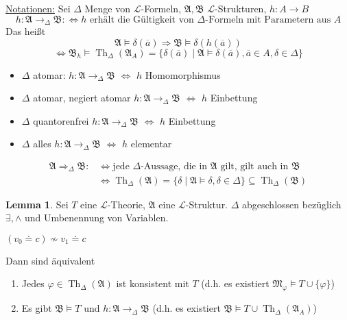 \documentclass[12pt,parskip=full]{scrartcl}
\newcommand{\heading}{\underline}
\theoremstyle{definition}
\newtheorem{lemma}[theorem]{Lemma}
\begin{document}
	\heading{Notationen:} Sei $\Delta$ Menge von $\mathcal{L}$-Formeln, $\mathfrak{A}, \mathfrak{B}$ $\mathcal{L}$-Strukturen, $h: A \to B$
	\begin{equation*}
		h: \mathfrak{A} \to_\Delta \mathfrak{B} :\Leftrightarrow \text{$h$ erhält die Gültigkeit von $\Delta$-Formeln mit Parametern aus $A$}
	\end{equation*}
	Das heißt
	\begin{equation*}
		\mathfrak{A} \models \delta(\overline{a}) \Rightarrow \mathfrak{B} \models \delta(h(\overline{a}))
	\end{equation*}
	\begin{equation*}
		\Leftrightarrow \mathfrak{B}_h \models \operatorname{Th}_\Delta(\mathfrak{A}_A) = \{ \delta(\overline{a}) \mid \mathfrak{A} \models \delta(\overline{a}), \overline{a} \in A, \delta \in \Delta \}
	\end{equation*}
	
	\begin{itemize}
		\item $\Delta$ atomar: $h: \mathfrak{A} \to_\Delta \mathfrak{B}$ $\Leftrightarrow$ $h$ Homomorphismus
		\item $\Delta$ atomar, negiert atomar $h: \mathfrak{A} \to_\Delta \mathfrak{B}$ $\Leftrightarrow$ $h$ Einbettung
		\item $\Delta$ quantorenfrei $h: \mathfrak{A} \to_\Delta \mathfrak{B}$ $\Leftrightarrow$ $h$ Einbettung
		\item $\Delta$ alles $h: \mathfrak{A} \to_\Delta \mathfrak{B}$ $\Leftrightarrow$ $h$ elementar
	\end{itemize}

	\begin{align*}
		\mathfrak{A} \Rightarrow_\Delta \mathfrak{B} :&\Leftrightarrow \text{jede $\Delta$-Aussage, die in $\mathfrak{A}$ gilt, gilt auch in $\mathfrak{B}$} \\
		&\Leftrightarrow \operatorname{Th}_\Delta(\mathfrak{A}) = \{ \delta \mid \mathfrak{A} \models \delta, \delta \in \Delta \} \subseteq \operatorname{Th}_\Delta(\mathfrak{B})
	\end{align*}

	\begin{lemma}
		Sei $T$ eine $\mathcal{L}$-Theorie, $\mathfrak{A}$ eine $\mathcal{L}$-Struktur. $\Delta$ abgeschlossen bezüglich $\exists, \land$ und Umbenennung von Variablen.
		
		$(v_0 \doteq c) \nsim v_1 \doteq c$
		
		Dann sind äquivalent
		\begin{enumerate}
			\item Jedes $\varphi \in \operatorname{Th}_\Delta(\mathfrak{A})$ ist konsistent mit $T$ (d.h. es existiert $\mathfrak{M}_\varphi \models T \cup \{ \varphi \}$)
			\item Es gibt $\mathfrak{B} \models T$ und $h: \mathfrak{A} \to_\Delta \mathfrak{B}$ (d.h. es existiert $\mathfrak{B} \models T \cup \operatorname{Th}_\Delta(\mathfrak{A}_A)$)
		\end{enumerate}
	\end{lemma}
\end{document}
